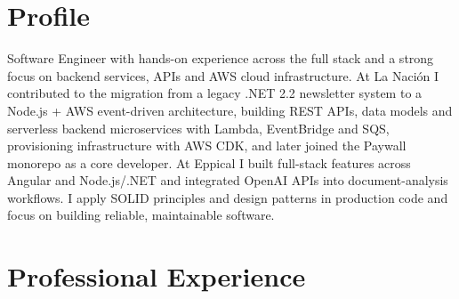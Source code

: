 \documentclass[11pt,a4paper,sans]{moderncv}
\begin{document}
\makecvtitle

\vspace{-4pt}

\section{Profile}
\vspace{1pt}
Software Engineer with hands-on experience across the full stack and a strong focus on backend
services, APIs and AWS cloud infrastructure. At La Naci\'{o}n I contributed to the migration from a legacy .NET 2.2 newsletter system to
a Node.js + AWS event-driven architecture, building REST APIs, data models and serverless backend microservices
with Lambda, EventBridge and SQS, provisioning infrastructure with AWS CDK, and later joined the Paywall monorepo as a core developer.
At Eppical I built full-stack features across Angular and Node.js/.NET and integrated OpenAI APIs into
document-analysis workflows. I apply SOLID principles and design patterns in production code and focus
on building reliable, maintainable software.

\section{Professional Experience}
\vspace{1pt}
\end{document}
